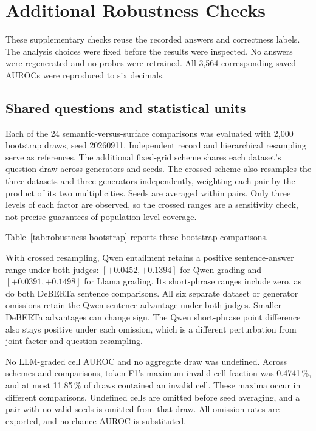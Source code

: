 \chapter{Additional Robustness Checks}
\label{app:robustness}

These supplementary checks reuse the recorded answers and correctness labels.
The analysis choices were fixed before the results were inspected. No answers
were regenerated and no probes were retrained. All 3,564 corresponding saved AUROCs were
reproduced to six decimals.

\section{Shared questions and statistical units}

Each of the 24 semantic-versus-surface comparisons was evaluated with 2,000
bootstrap draws, seed 20260911. Independent record and hierarchical resampling
serve as references. The additional fixed-grid scheme shares each dataset's
question draw across generators and seeds. The crossed scheme also resamples
the three datasets and three generators independently, weighting each pair
by the product of its two multiplicities. Seeds are averaged within pairs.
Only three levels of each factor are observed, so the crossed ranges are a
sensitivity check, not precise guarantees of population-level coverage.

Table~\ref{tab:robustness-bootstrap} reports these bootstrap comparisons.


With crossed resampling, Qwen entailment retains a positive sentence-answer
range under both judges: $[+0.0452,+0.1394]$ for Qwen grading and
$[+0.0391,+0.1498]$ for Llama grading. Its short-phrase ranges include zero,
as do both DeBERTa sentence comparisons. All six separate dataset or generator
omissions retain the Qwen sentence advantage under both judges. Smaller
DeBERTa advantages can change sign. The Qwen short-phrase point difference
also stays positive under each omission, which is a different perturbation
from joint factor and question resampling.

No LLM-graded cell AUROC and no aggregate draw was undefined. Across schemes
and comparisons, token-F1's maximum invalid-cell fraction was 0.4741\,\%,
and at most 11.85\,\% of draws contained an invalid cell. These maxima occur in
different comparisons. Undefined cells are omitted before seed averaging,
and a pair with no valid seeds is omitted from that draw. All omission rates
are exported, and no chance AUROC is substituted.

